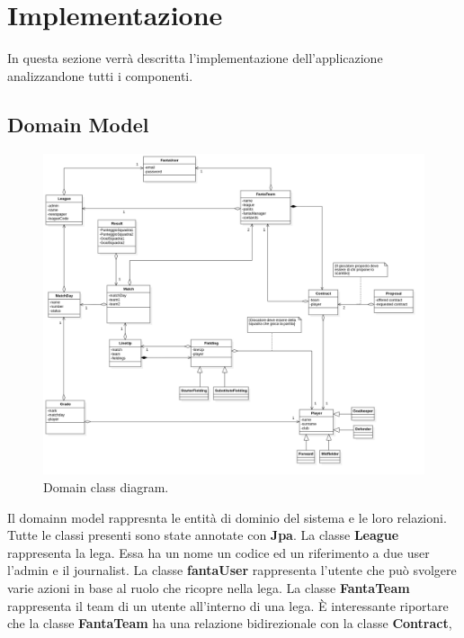 \section{Implementazione}
In questa sezione verrà descritta l'implementazione dell'applicazione analizzandone tutti
i componenti.
\subsection{Domain Model}
\begin{figure}
    \centering
    \includegraphics[width=\textwidth]{Resources/graficiUML/ClassDiagram.png}        
    \caption{Domain class diagram.}
    \label{fig:domain_class_diagram2}
\end{figure}
Il domainn model rappresnta le entità di dominio del sistema e le loro relazioni.
Tutte le classi presenti sono state annotate con \textbf{Jpa}.
La classe \textbf{League} rappresenta la lega. Essa ha un nome un codice ed un riferimento
a due user l'admin e il journalist. La classe \textbf{fantaUser} rappresenta l'utente che può
svolgere varie azioni in base al ruolo che ricopre nella lega. La classe \textbf{FantaTeam}
rappresenta il team di un utente all'interno di una lega. È interessante riportare
che la classe \textbf{FantaTeam} ha una relazione bidirezionale con la classe \textbf{Contract},
